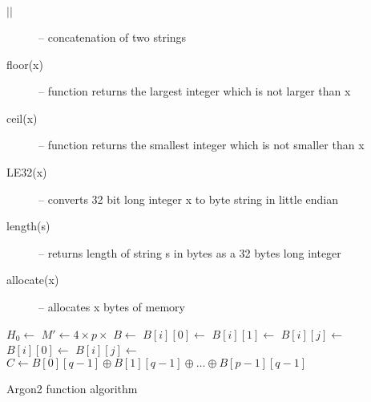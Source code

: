 \documentclass[nolof]{fithesis3}
\begin{document}
\begin{description}
\item[\(||\)] -- concatenation of two strings

\item[floor(x)] -- function returns the largest integer which is not larger than x

\item[ceil(x)] -- function returns the smallest integer which is not smaller than x

\item[LE32(x)] -- converts 32 bit long integer x to byte string in little endian

\item[length(s)] -- returns length of string s in bytes as a 32 bytes long integer

\item[allocate(x)] -- allocates x bytes of memory
\end{description}

\begin{algorithm}
\DontPrintSemicolon
\LinesNumbered
{}
\(H_0 \leftarrow \)  \;
\(M' \leftarrow 4 \times p \times \)  \;
\(B \leftarrow \)  \;
 {
\(B[i][0] \leftarrow \)  \;
}
 {
\(B[i][1] \leftarrow \)  \;
}
 {
 {
\(B[i][j] \leftarrow \)  \;
}
}
 {
 {
\(B[i][0] \leftarrow \)  \;
 {
\(B[i][j] \leftarrow \)  \;
}
}
}
\(C \leftarrow B[0][q-1] \oplus B[1][q-1] \oplus \dots \oplus B[p-1][q-1]\) \;
\caption{Argon2 function algorithm}
\label{argon2alg}
\end{algorithm}
\end{document}

